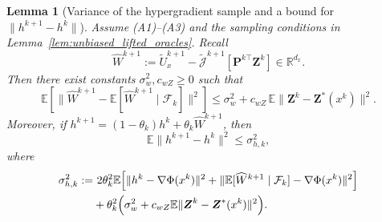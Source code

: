 \documentclass{pkumelon}
\theoremstyle{plain}
\newtheorem{lemma}{Lemma}
\newcommand{\R}{\mathbb{R}}
\newcommand{\E}{\mathbb{E}}
\newcommand{\Phiobj}{\Phi}
\begin{document}
\begin{lemma}[Variance of the hypergradient sample and a bound for $\|h^{k+1}-h^k\|$]\label{lem:variance_rso}
Assume \emph{(A1)}--\emph{(A3)} and the sampling conditions in Lemma~\ref{lem:unbiased_lifted_oracles}. Recall
\begin{equation*}
\widehat W^{k+1}:=\tilde U_x^{k+1}-\tilde{\mathcal J}^{k+1}[\boldsymbol P^{k\top}\boldsymbol Z^k]\in\R^{d_x}.
\end{equation*}
Then there exist constants $\sigma_w^2,c_{wZ}\ge 0$ such that
\begin{equation}\label{eq:w_var_rso}
\E[\|\widehat W^{k+1}-\E[\widehat W^{k+1}\mid\mathcal F_k]\|^2]
\le \sigma_w^2+c_{wZ}\,\E\|\boldsymbol Z^k-\boldsymbol Z^*(x^k)\|^2.
\end{equation}
Moreover, if $h^{k+1}=(1-\theta_k)h^k+\theta_k\widehat W^{k+1}$, then
\begin{equation}\label{eq:h_step_rso}
\E\|h^{k+1}-h^k\|^2\le \sigma_{h,k}^2,
\end{equation}
where
\begin{equation}\label{eq:h_step_rso_def}
\begin{aligned}
\sigma_{h,k}^2:=
&\ 2\theta_k^2\E\!\left[
\|h^k-\nabla\Phiobj(x^k)\|^2
+\|\E[\widehat W^{k+1}\mid\mathcal F_k]-\nabla\Phiobj(x^k)\|^2
\right] \\
&+\theta_k^2\Bigl(\sigma_w^2+c_{wZ}\E\|\boldsymbol Z^k-\boldsymbol Z^*(x^k)\|^2\Bigr).
\end{aligned}
\end{equation}
\end{lemma}
\end{document}
